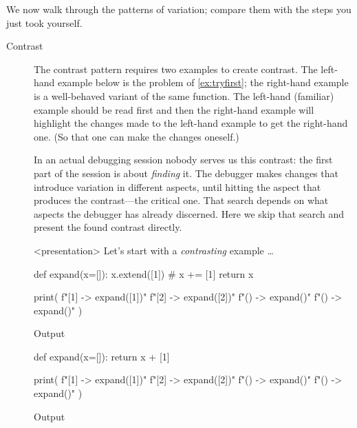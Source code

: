 We now walk through the patterns of variation; compare them with the steps
you just took yourself.

\begin{description}
  \item[Contrast] The contrast pattern requires two examples to create
    contrast.
    The left-hand example below is the problem of \cref{ex:tryfirst}; the
    right-hand example is a well-behaved variant of the same function.
    The left-hand (familiar) example should be read first and then the
    right-hand example will highlight the changes made to the left-hand
    example to get the right-hand one.
    (So that one can make the changes oneself.)

    In an actual debugging session nobody serves us this contrast: the first
    part of the session is about \emph{finding} it.
    The debugger makes changes that introduce variation in different
    aspects, until hitting the aspect that produces the contrast---the
    critical one.
    That search depends on what aspects the debugger has already discerned.
    Here we skip that search and present the found contrast directly.

    \begin{frame}<presentation>
      Let's start with a \emph{contrasting} example \dots
    \end{frame}

    \begin{frame}[fragile]
    \begin{minipage}[t]{0.45\columnwidth}
      \begin{pyblock}[default2]
def expand(x=[]):
  x.extend([1]) # x += [1]
  return x

print(
  f"[1] -> {expand([1])}\n"
  f"[2] -> {expand([2])}\n"
  f"()  -> {expand()}\n"
  f"()  -> {expand()}\n"
)
      \end{pyblock}
      \begin{block}{Output}\printpythontex[verbatim][highlightlines={4}]\end{block}
    \end{minipage}
    \hfill
    \begin{minipage}[t]{0.45\columnwidth}
      \begin{pyblock}[default1][highlightlines={2}]
def expand(x=[]):
  return x + [1]


print(
  f"[1] -> {expand([1])}\n"
  f"[2] -> {expand([2])}\n"
  f"()  -> {expand()}\n"
  f"()  -> {expand()}\n"
)
      \end{pyblock}
      \begin{block}{Output}\printpythontex[verbatim][highlightlines={4}]\end{block}
    \end{minipage}
    \end{frame}


\end{description}
